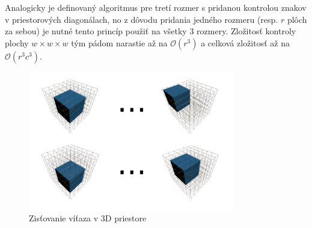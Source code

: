 Analogicky je definovaný algoritmus pre tretí rozmer s pridanou kontrolou znakov v priestorových diagonálach, no
z dôvodu pridania jedného rozmeru (resp. $r$ plôch za sebou) je nutné tento princíp použiť na všetky 3 rozmery.
Zložitosť kontroly plochy $w \times w \times w$ tým pádom narastie až na $\mathcal{O}(r^3)$ a celková zložitosť až na
$\mathcal{O}(r^3c^3)$.

\begin{figure}[H]
    \centering
    \includegraphics[width=0.8\textwidth]{images/winner-3D.png}
    \caption{Zisťovanie víťaza v 3D priestore}
\end{figure}
